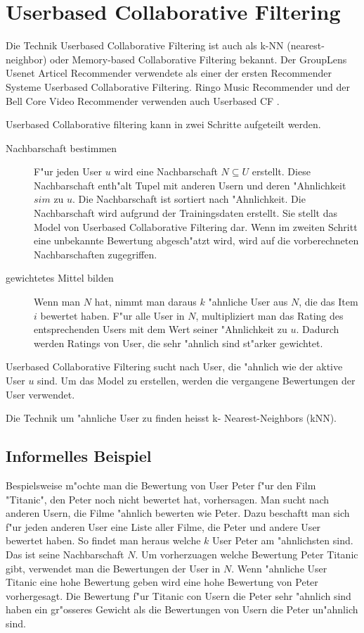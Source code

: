 \documentclass[a4paper, 12pt]{article}
\begin{document}
\section{Userbased Collaborative Filtering}

Die Technik Userbased Collaborative Filtering ist auch als k-NN (nearest-neighbor) oder Memory-based Collaborative Filtering bekannt. Der GroupLens Usenet Articel Recommender verwendete als einer der ersten Recommender Systeme Userbased Collaborative Filtering. Ringo Music Recommender und der Bell Core Video Recommender verwenden auch Userbased CF \cite{ekstrand11}.

Userbased Collaborative filtering kann in zwei Schritte aufgeteilt werden. 

\begin{description}
\item[Nachbarschaft bestimmen] F"ur jeden User $u$ wird eine Nachbarschaft $N \subseteq U$ erstellt. Diese Nachbarschaft enth"alt Tupel mit anderen Usern und deren "Ahnlichkeit $sim$ zu $u$. Die Nachbarschaft ist sortiert nach "Ahnlichkeit. Die Nachbarschaft wird aufgrund der Trainingsdaten erstellt. Sie stellt das Model von Userbased Collaborative Filtering dar. Wenn im zweiten Schritt eine unbekannte Bewertung abgesch"atzt wird, wird auf die vorberechneten Nachbarschaften zugegriffen.
\item [gewichtetes Mittel bilden] Wenn man $N$ hat, nimmt man daraus $k$ "ahnliche User aus $N$, die das Item $i$ bewertet haben. F"ur alle User in $N$, multipliziert man das Rating des entsprechenden Users mit dem Wert seiner "Ahnlichkeit zu $u$. Dadurch werden Ratings von User, die sehr "ahnlich sind st"arker gewichtet. 
\end{description}

Userbased Collaborative Filtering sucht nach User, die "ahnlich wie der aktive User $u$ sind. Um das Model zu erstellen, werden die vergangene Bewertungen der User verwendet.

Die Technik um "ahnliche User zu finden heisst k- Nearest-Neighbors (kNN). 

\subsection{Informelles Beispiel}
\label{sec:example}

Bespielsweise m"ochte man die Bewertung von User Peter f"ur den Film "Titanic", den Peter noch nicht bewertet hat, vorhersagen. Man sucht nach anderen Usern, die Filme "ahnlich bewerten wie Peter. Dazu beschaftt man sich f"ur jeden anderen User eine Liste aller Filme, die Peter und andere User bewertet haben. So findet man heraus welche $k$ User Peter am "ahnlichsten sind. Das ist seine Nachbarschaft $N$. Um vorherzuagen welche Bewertung Peter Titanic gibt, verwendet man die Bewertungen der User in $N$. Wenn "ahnliche User Titanic eine hohe Bewertung geben wird eine hohe Bewertung von Peter vorhergesagt. Die Bewertung f"ur Titanic con Usern die Peter sehr "ahnlich sind haben ein gr"osseres Gewicht als die Bewertungen von Usern die Peter un"ahnlich sind.
\end{document}
